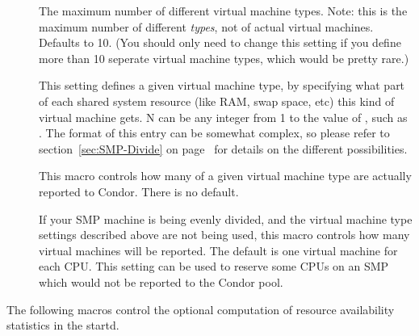 \begin{description}

\item[]
\label{param:MaxVirtualMachineTypes}
  The maximum number of different virtual machine types.  
  Note: this is the maximum number of different \emph{types}, not of
  actual virtual machines.
  Defaults to 10.  
  (You should only need to change this setting if you define more than
  10 seperate virtual machine types, which would be pretty rare.)

\item[]
\label{param:VirtualMachineTypeN}
  This setting defines a given virtual machine type, by specifying
  what part of each shared system resource (like RAM, swap space, etc)
  this kind of virtual machine gets.
  N can be any integer from 1 to the value of
  , such as
  . 
  The format of this entry can be somewhat complex, so please refer to
  section~\ref{sec:SMP-Divide} on page~\pageref{sec:SMP-Divide} for
  details on the different possibilities.

\item[]
\label{param:NumVirtualMachinesTypeN}
  This macro controls how many of a given virtual machine type
  are actually reported to Condor.
  There is no default.

\item[]
\label{param:NumVirtualMachines}
  If your SMP machine is being evenly divided, and the virtual
  machine type settings described above are not being used, this
  macro controls how many virtual machines will be reported.  
  The default is one virtual machine for each CPU.
  This setting can be used to reserve some CPUs on an SMP which would
  not be reported to the Condor pool.

\end{description}

The following macros control the optional computation of resource
availability statistics in the startd.

